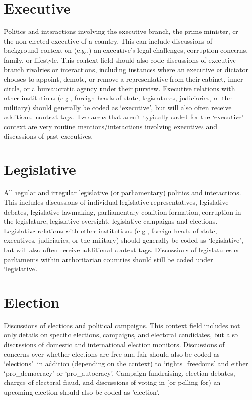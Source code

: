 \documentclass[11pt]{report}
\begin{document}
\section{Executive}\label{context:executive}

Politics and interactions involving the executive branch, the prime minister, or the non-elected executive of a country. This can include discussions of background context on (e.g.,) an executive's legal challenges, corruption concerns, family, or lifestyle. This context field should also code discussions of executive-branch rivalries or interactions, including instances where an executive or dictator chooses to appoint, demote, or remove a representative from their cabinet, inner circle, or a bureaucratic agency under their purview. Executive relations with other institutions (e.g., foreign heads of state, legislatures, judiciaries, or the military) should generally be coded as `executive', but will also often receive additional context tags. Two areas that aren't typically coded for the `executive' context are very routine mentions/interactions involving executives and discussions of past executives.

\section{Legislative}\label{context:legislative}

All regular and irregular legislative (or parliamentary) politics and interactions. This includes discussions of individual legislative representatives, legislative debates, legislative lawmaking, parliamentary coalition formation, corruption in the legislature, legislative oversight, legislative campaigns and elections. Legislative relations with other institutions (e.g., foreign heads of state, executives, judiciaries, or the military) should generally be coded as `legislative', but will also often receive additional context tags. Discussions of legislatures or parliaments within authoritarian countries should still be coded under `legislative'.

\section{Election}\label{context:election}
Discussions of elections and political campaigns. This context field includes not only details on specific elections, campaigns, and electoral candidates, but also discussions of domestic and international election monitors. Discussions of concerns over whether elections are free and fair should also be coded as `elections', in addition (depending on the context) to `rights\_freedoms' and either `pro\_democracy' or `pro\_autocracy'. Campaign fundraising, election debates, charges of electoral fraud, and discussions of voting in (or polling for) an upcoming election should also be coded as 'election'.
\end{document}
